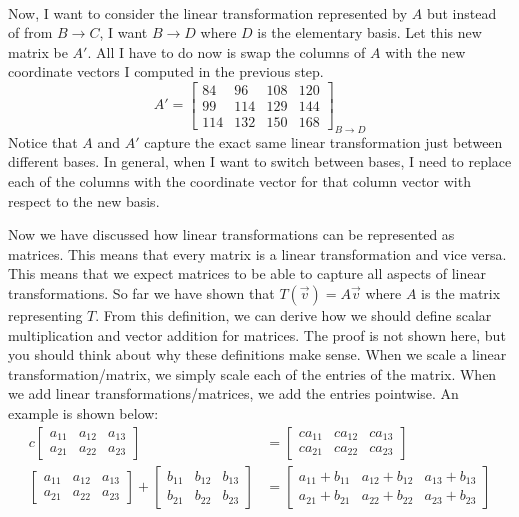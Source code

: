 \begin{example}
\begin{align*}
    \end{align*}
    Now, I want to consider the linear transformation represented by $A$ but instead of from $B\to C$, I want $B\to D$ where $D$ is the elementary basis. Let this new matrix be $A'$. All I have to do now is swap the columns of $A$ with the new coordinate vectors I computed in the previous step.
    $$A'=\begin{bmatrix}
        84 & 96 & 108 & 120\\
        99 & 114 & 129 & 144\\
        114 & 132 & 150 & 168
    \end{bmatrix}_{B\to D}$$
    Notice that $A$ and $A'$ capture the exact same linear transformation just between different bases. In general, when I want to switch between bases, I need to replace each of the columns with the coordinate vector for that column vector with respect to the new basis. 
\end{example}
Now we have discussed how linear transformations can be represented as matrices. This means that every matrix is a linear transformation and vice versa. This means that we expect matrices to be able to capture all aspects of linear transformations. So far we have shown that $T(\vec{v})=A\vec{v}$ where $A$ is the matrix representing $T$. From this definition, we can derive how we should define scalar multiplication and vector addition for matrices. The proof is not shown here, but you should think about why these definitions make sense. When we scale a linear transformation/matrix, we simply scale each of the entries of the matrix. When we add linear transformations/matrices, we add the entries pointwise. An example is shown below:
\begin{align*}
    c\begin{bmatrix}
      a_{11} & a_{12} & a_{13} \\ a_{21} & a_{22} & a_{23}
    \end{bmatrix}&=\begin{bmatrix}
      ca_{11} & ca_{12} & ca_{13} \\ ca_{21} & ca_{22} & ca_{23}
    \end{bmatrix}\\
    \begin{bmatrix}
      a_{11} & a_{12} & a_{13} \\ a_{21} & a_{22} & a_{23}
    \end{bmatrix}+\begin{bmatrix}
      b_{11} & b_{12} & b_{13} \\ b_{21} & b_{22} & b_{23}
    \end{bmatrix}&=\begin{bmatrix}
      a_{11}+b_{11} & a_{12}+b_{12} & a_{13}+b_{13} \\ a_{21}+b_{21} & a_{22}+b_{22} & a_{23}+b_{23}
    \end{bmatrix}
\end{align*}
